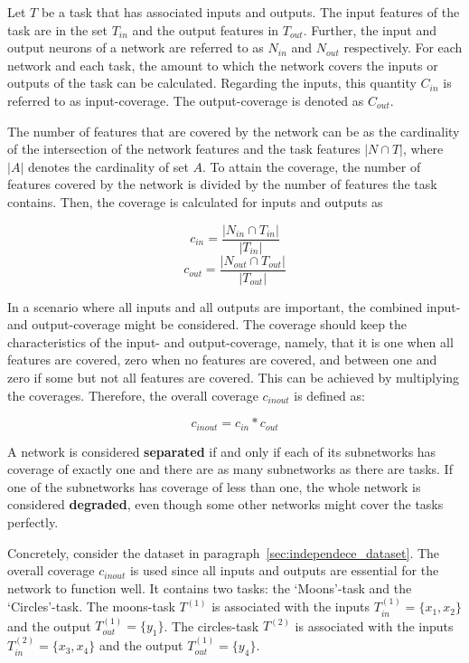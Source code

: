 Let $T$ be a task that has associated inputs and outputs.
The input features of the task are in the set $T_{in}$ and the output features in $T_{out}$.
Further, the input and output neurons of a network are referred to as $N_{in}$ and $N_{out}$ respectively.
For each network and each task, the amount to which the network covers the inputs or outputs of the task can be calculated.
Regarding the inputs, this quantity $C_{in}$ is referred to as input-coverage. The output-coverage is denoted as $C_{out}$.

The number of features that are covered by the network can be as the cardinality of the intersection of the network features and the task features $ |N \cap T|$, where  $|A|$ denotes the cardinality of set $A$.
To attain the coverage, the number of features covered by the network is divided by the number of features the task contains.
Then, the coverage is calculated for inputs and outputs as 

\[
c_{in} = \frac{|N_{in}  \cap T_{in} |}{|T_{in} |}
\]
\[
c_{out} = \frac{|N_{out}  \cap T_{out} |}{|T_{out}|}
\]

In a scenario where all inputs and all outputs are important, the combined input- and output-coverage might be considered.
The coverage should keep the characteristics of the input- and output-coverage, namely, that it is one when all features are covered, zero when no features are covered, and between one and zero if some but not all features are covered.
This can be achieved by multiplying the coverages.
Therefore, the overall coverage $c_{inout}$ is defined as:

\[
    c_{inout} = c_{in} * c_{out}
\]

A network is considered \textbf{separated} if and only if each of its subnetworks has coverage of exactly one and there are as many subnetworks as there are tasks.
If one of the subnetworks has coverage of less than one, the whole network is considered \textbf{degraded}, even though some other networks might cover the tasks perfectly.

Concretely, consider the dataset in paragraph~\ref{sec:independece_dataset}.
The overall coverage $c_{inout}$ is used since all inputs and outputs are essential for the network to function well.
It contains two tasks: the `Moons'-task and the `Circles'-task. 
The moons-task $T^{(1)}$ is associated with the inputs $T^{(1)}_{in} = \{x_1,x_2\}$ and the output $T^{(1)}_{out} = \{y_1\}$.
The circles-task $T^{(2)}$ is associated with the inputs $T^{(2)}_{in} = \{x_3,x_4\}$ and the output $T^{(1)}_{out} = \{y_4\}$.

